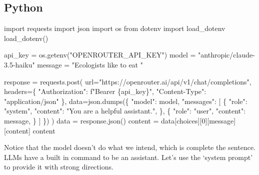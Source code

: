 \documentclass[
  letterpaper,
  DIV=11,
  numbers=noendperiod]{scrreprt}
\newenvironment{Shaded}{\begin{snugshade}}{\end{snugshade}}
\newcommand{\DecValTok}[1]{\textcolor[rgb]{0.68,0.00,0.00}{#1}}
\newcommand{\ImportTok}[1]{\textcolor[rgb]{0.00,0.46,0.62}{#1}}
\newcommand{\NormalTok}[1]{\textcolor[rgb]{0.00,0.23,0.31}{#1}}
\newcommand{\OperatorTok}[1]{\textcolor[rgb]{0.37,0.37,0.37}{#1}}
\newcommand{\SpecialCharTok}[1]{\textcolor[rgb]{0.37,0.37,0.37}{#1}}
\newcommand{\SpecialStringTok}[1]{\textcolor[rgb]{0.13,0.47,0.30}{#1}}
\newcommand{\StringTok}[1]{\textcolor[rgb]{0.13,0.47,0.30}{#1}}
\begin{document}
\subsection{Python}

\begin{Shaded}
\begin{Highlighting}[]
\ImportTok{import}\NormalTok{ requests}
\ImportTok{import}\NormalTok{ json}
\ImportTok{import}\NormalTok{ os}
\ImportTok{from}\NormalTok{ dotenv }\ImportTok{import}\NormalTok{ load\_dotenv}
\NormalTok{load\_dotenv()}

\NormalTok{api\_key }\OperatorTok{=}\NormalTok{ os.getenv(}\StringTok{"OPENROUTER\_API\_KEY"}\NormalTok{)}
\NormalTok{model }\OperatorTok{=} \StringTok{"anthropic/claude{-}3.5{-}haiku"}
\NormalTok{message }\OperatorTok{=} \StringTok{"Ecologists like to eat "}

\NormalTok{response }\OperatorTok{=}\NormalTok{ requests.post(}
\NormalTok{  url}\OperatorTok{=}\StringTok{"https://openrouter.ai/api/v1/chat/completions"}\NormalTok{,}
\NormalTok{  headers}\OperatorTok{=}\NormalTok{\{}
    \StringTok{"Authorization"}\NormalTok{: }\SpecialStringTok{f"Bearer }\SpecialCharTok{\{}\NormalTok{api\_key}\SpecialCharTok{\}}\SpecialStringTok{"}\NormalTok{,}
    \StringTok{"Content{-}Type"}\NormalTok{: }\StringTok{"application/json"}
\NormalTok{  \},}
\NormalTok{  data}\OperatorTok{=}\NormalTok{json.dumps(\{}
    \StringTok{"model"}\NormalTok{: model,}
    \StringTok{"messages"}\NormalTok{: [}
\NormalTok{      \{}
        \StringTok{"role"}\NormalTok{: }\StringTok{"system"}\NormalTok{,}
        \StringTok{"content"}\NormalTok{: }\StringTok{"You are a helpful assistant."}\NormalTok{,}
\NormalTok{      \},}
\NormalTok{      \{}
        \StringTok{"role"}\NormalTok{: }\StringTok{"user"}\NormalTok{,}
        \StringTok{"content"}\NormalTok{: message,}
\NormalTok{      \}}
\NormalTok{    ]}
\NormalTok{  \})}
\NormalTok{)}
\NormalTok{data }\OperatorTok{=}\NormalTok{ response.json()}
\NormalTok{content }\OperatorTok{=}\NormalTok{ data[}\StringTok{\textquotesingle{}choices\textquotesingle{}}\NormalTok{][}\DecValTok{0}\NormalTok{][}\StringTok{\textquotesingle{}message\textquotesingle{}}\NormalTok{][}\StringTok{\textquotesingle{}content\textquotesingle{}}\NormalTok{]}
\NormalTok{content}
\end{Highlighting}
\end{Shaded}

Notice that the model doesn't do what we intend, which is complete the
sentence. LLMs have a built in command to be an assistant. Let's use the
`system prompt' to provide it with strong directions.
\end{document}

